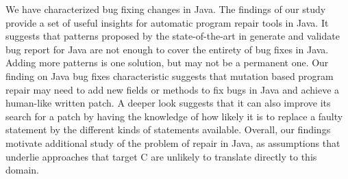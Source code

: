 \documentclass{sig-alternate-05-2015}
\begin{document}
We have characterized bug fixing changes in Java.
The findings of our study provide a set of useful insights for automatic
program repair tools in Java. It suggests that patterns proposed by the
state-of-the-art in generate and validate bug report for Java are not enough to
cover the entirety of bug fixes in Java. Adding more patterns is one solution,
but may not be a permanent one. Our finding on Java bug fixes characteristic
suggests that mutation based program repair may need to add new fields or
methods to fix bugs in Java and achieve a human-like written patch. A deeper
look suggests that it can also improve its search for a patch by having the knowledge of how
likely it is to replace a faulty statement by the different kinds of statements
available. Overall, our findings motivate additional study of the problem of
repair in Java, as assumptions that underlie approaches that target C are
unlikely to translate directly to this domain. 



\end{document}
